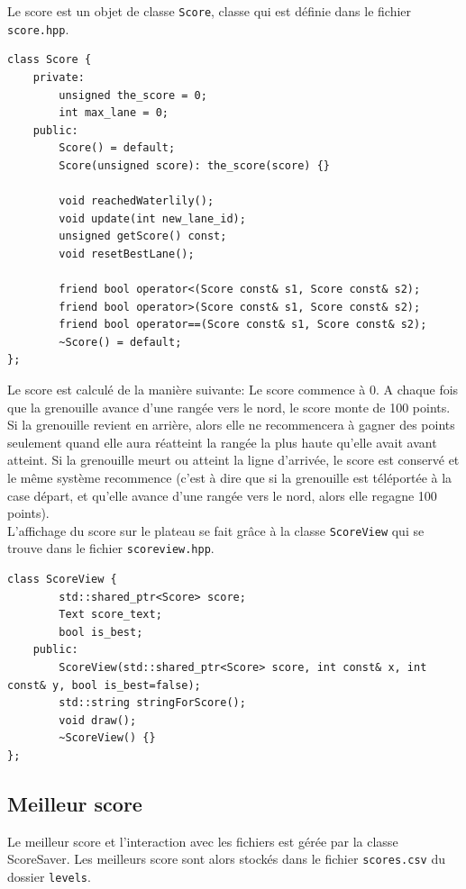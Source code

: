 \documentclass[a4paper, 12pt]{article}
\begin{document}
Le score est un objet de classe \texttt{Score}, 
classe qui est définie dans le fichier \texttt{score.hpp}.
\begin{lstlisting}
class Score {
    private:
        unsigned the_score = 0;
        int max_lane = 0;
    public:
        Score() = default;
        Score(unsigned score): the_score(score) {}

        void reachedWaterlily();
        void update(int new_lane_id);
        unsigned getScore() const;
        void resetBestLane();

        friend bool operator<(Score const& s1, Score const& s2);
        friend bool operator>(Score const& s1, Score const& s2);
        friend bool operator==(Score const& s1, Score const& s2);
        ~Score() = default;
};
\end{lstlisting}

Le score est calculé de la manière suivante: 
Le score commence à 0. 
A chaque fois que la grenouille avance d'une rangée vers le nord, le score monte de 100 points.
Si la grenouille revient en arrière, 
alors elle ne recommencera à gagner des points seulement quand elle aura réatteint la rangée 
la plus haute qu'elle avait avant atteint.
Si la grenouille meurt ou atteint la ligne d'arrivée, le score est conservé et le même système
recommence (c'est à dire que si la grenouille est téléportée à la case départ, et qu'elle
avance d'une rangée vers le nord, alors elle regagne 100 points). \\

L'affichage du score sur le plateau se fait grâce à la classe \texttt{ScoreView}
qui se trouve dans le fichier \texttt{scoreview.hpp}.

\begin{lstlisting}
class ScoreView {
        std::shared_ptr<Score> score;
        Text score_text;
        bool is_best;
    public:
        ScoreView(std::shared_ptr<Score> score, int const& x, int const& y, bool is_best=false);
        std::string stringForScore();
        void draw();
        ~ScoreView() {}
};
\end{lstlisting}

\subsection{Meilleur score}

Le meilleur score et l'interaction avec les fichiers est gérée par la classe ScoreSaver.
Les meilleurs score sont alors stockés dans le fichier \texttt{scores.csv} du dossier
\texttt{levels}.
\end{document}
